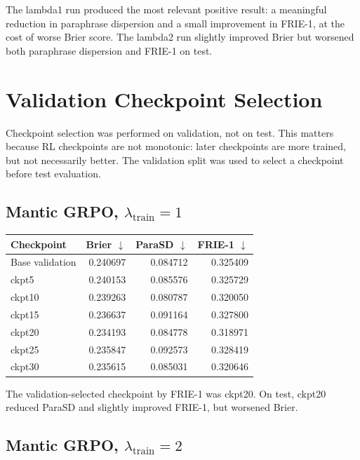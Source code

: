 \documentclass[11pt]{article}
\begin{document}
The lambda1 run produced the most relevant positive result: a meaningful
reduction in paraphrase dispersion and a small improvement in FRIE-1, at the
cost of worse Brier score. The lambda2 run slightly improved Brier but worsened
both paraphrase dispersion and FRIE-1 on test.

\section{Validation Checkpoint Selection}

Checkpoint selection was performed on validation, not on test. This matters
because RL checkpoints are not monotonic: later checkpoints are more trained,
but not necessarily better. The validation split was used to select a checkpoint
before test evaluation.

\subsection{Mantic GRPO, $\lambda_{\mathrm{train}}=1$}

\begin{center}
\begin{tabular}{lrrr}
\toprule
Checkpoint & Brier $\downarrow$ & ParaSD $\downarrow$ & FRIE-1 $\downarrow$ \\
\midrule
Base validation & 0.240697 & 0.084712 & 0.325409 \\
ckpt5 & 0.240153 & 0.085576 & 0.325729 \\
ckpt10 & 0.239263 & 0.080787 & 0.320050 \\
ckpt15 & 0.236637 & 0.091164 & 0.327800 \\
ckpt20 & 0.234193 & 0.084778 & 0.318971 \\
ckpt25 & 0.235847 & 0.092573 & 0.328419 \\
ckpt30 & 0.235615 & 0.085031 & 0.320646 \\
\bottomrule
\end{tabular}
\end{center}

The validation-selected checkpoint by FRIE-1 was ckpt20. On test, ckpt20 reduced
ParaSD and slightly improved FRIE-1, but worsened Brier.

\subsection{Mantic GRPO, $\lambda_{\mathrm{train}}=2$}
\end{document}
